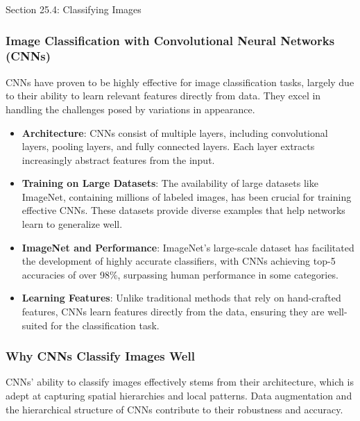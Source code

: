 \begin{notes}{Section 25.4: Classifying Images}
\begin{highlight}
    \end{highlight}
    
    \subsubsection*{Image Classification with Convolutional Neural Networks (CNNs)}
    
    CNNs have proven to be highly effective for image classification tasks, largely due to their ability to learn relevant features directly from data. They excel in handling the challenges posed by variations 
    in appearance.
    
    \begin{highlight}
    
        \begin{itemize}
            \item \textbf{Architecture}: CNNs consist of multiple layers, including convolutional layers, pooling layers, and fully connected layers. Each layer extracts increasingly abstract features from the input.
            \item \textbf{Training on Large Datasets}: The availability of large datasets like ImageNet, containing millions of labeled images, has been crucial for training effective CNNs. These datasets 
            provide diverse examples that help networks learn to generalize well.
            \item \textbf{ImageNet and Performance}: ImageNet's large-scale dataset has facilitated the development of highly accurate classifiers, with CNNs achieving top-5 accuracies of over 98\%, surpassing 
            human performance in some categories.
            \item \textbf{Learning Features}: Unlike traditional methods that rely on hand-crafted features, CNNs learn features directly from the data, ensuring they are well-suited for the classification 
            task.
        \end{itemize}
    
    \end{highlight}
    
    \subsubsection*{Why CNNs Classify Images Well}
    
    CNNs' ability to classify images effectively stems from their architecture, which is adept at capturing spatial hierarchies and local patterns. Data augmentation and the hierarchical structure of CNNs 
    contribute to their robustness and accuracy.
    

\end{notes}
